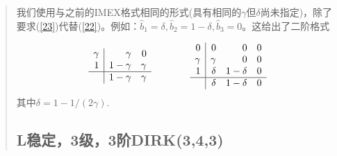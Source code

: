 \documentclass{article}
\begin{document}
\begin{CJK}{UTF8}{gkai}
\begin{quotation}
我们使用与之前的IMEX格式相同的形式(具有相同的$\gamma$但$\delta$尚未指定)，除了要求(\ref{23})代替(\ref{22})。例如：$\widehat{b}_{1}=\delta,\widehat{b}_{2}=1-\delta,\widehat{b}_{3}=0$。这给出了二阶格式

\[
\begin{array}{r|rr}
\gamma & \gamma & 0\\
1 & 1-\gamma & \gamma \\
\hline
&1-\gamma & \gamma 
\end{array}~~~~~~~~~~~~
\begin{array}{r|rrr}
0 & 0 & 0 & 0 \\
\gamma & \gamma & 0 & 0\\
1 & \delta & 1-\delta & 0\\
\hline
& \delta & 1-\delta & 0
\end{array}
\]
其中$\delta=1-1/(2\gamma)$.

\subsection{L稳定，3级，3阶DIRK(3,4,3)}


\end{quotation}
\end{CJK}
\end{document}
